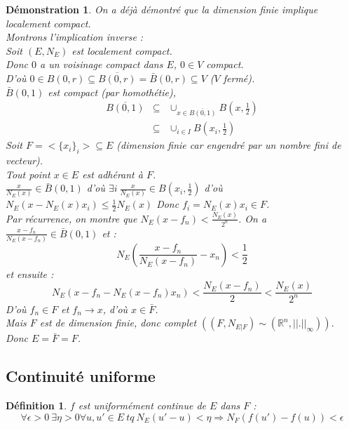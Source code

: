 \documentclass[a4paper, oneside]{report}
\theoremstyle{break}
\newtheorem{defi}[thm]{Définition}
\newtheorem*{demo}{Démonstration}
\newcommand{\R}{\mathbb{R}}
\newcommand{\fracun}[1]{\frac{1}{#1}}
\begin{document}
\begin{demo}
On a déjà démontré que la dimension finie implique localement compact.\\
Montrons l'implication inverse :\\
Soit $(E,N_E)$ est localement compact.\\
Donc $0$ a un voisinage compact dans $E$, $0\in V$ compact.\\
D'où $0\in B(0,r)\subseteq \overline{B(0,r)} = \bar{B}(0,r) \subseteq V$ ($V$ fermé).\\
$\bar{B}(0,1)$ est compact (par homothétie),
$$\begin{array}{lll}
\overline{B(0,1)} &\subseteq & \cup_{x\in \overline{B(0,1)}} B(x,\fracun{2})\\
&\subseteq & \cup_{i\in I}B(x_i, \fracun{2})
\end{array}$$
Soit $F = <\{x_i\}_i> \subseteq E$ (dimension finie car engendré par un nombre fini de vecteur).\\
Tout point $x\in E$ est adhérant à $F$.\\
$\frac{x}{N_E(x)} \in \bar{B}(0,1)$ d'où $\exists i~\frac{x}{N_E(x)} \in B(x_i, \fracun{2})$ d'où $N_E(x-N_E(x)x_i)\leq \fracun{2}N_E(x)$
Donc $f_i = N_E(x)x_i \in F$.\\
Par récurrence, on montre que $N_E(x-f_n)<\frac{N_E(x)}{2^n}$. On a $\frac{x-f_n}{N_E(x-f_n)} \in \bar{B}(0,1)$ et :
$$N_E(\frac{x-f_n}{N_E(x-f_n)} - x_n) < \fracun{2}$$
et ensuite :
$$N_E(x-f_n-N_E(x-f_n)x_n)<\frac{N_E(x-f_n)}{2}<\frac{N_E(x)}{2^n}$$
D'où $f_n \in F$ et $f_n \rightarrow x$, d'où $x\in \bar{F}$.\\
Mais $F$ est de dimension finie, donc complet $((F,N_{E|F})\sim (\R^n,||.||_\infty))$.\\
Donc $E=\bar{F}=F$.
\end{demo}

\subsection{Continuité uniforme}

\begin{defi}
$f$ est uniformément continue de $E$ dans $F$ :
$$\forall \epsilon >0~\exists \eta >0 \forall u,u'\in E~tq~N_E(u'-u)<\eta \Rightarrow N_F(f(u')-f(u))<\epsilon$$
\end{defi}
\end{document}
